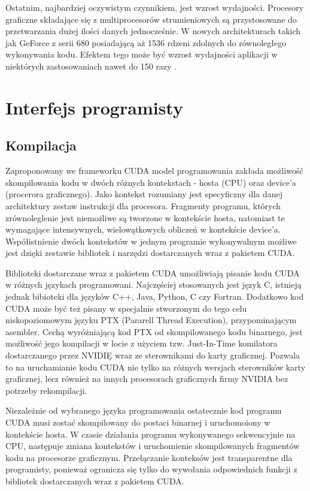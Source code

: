 Ostatnim, najbardziej oczywistym czynnikiem, jest wzrost wydajności. Procesory
graficzne składające się z multiprocesorów strumieniowych są przystosowane do
przetwarzania dużej ilości danych jednocześnie. W nowych architekturach takich
jak GeForce z serii 680 posiadającą aż 1536 rdzeni zdolnych do równoległego
wykonywania kodu. Efektem tego może być wzrost wydajności aplikacji w niektórych
zastosowaniach nawet do 150 razy \cite{prez}.

\section{Interfejs programisty}

\subsection{Kompilacja}

Zaproponowany we frameworku CUDA model programowania zakłada możliwość
skompilowania kodu w dwóch różnych kontekstach - hosta (CPU) oraz device'a
(procerora graficznego). Jako kontekst rozumiany jest specyficzny dla danej architektury zestaw
instrukcji dla procesora. Fragmenty programu, których zrównoleglenie jest
niemożliwe są tworzone w kontekście hosta, natomiast te wymagające intensywnych,
wielowątkowych obliczeń w kontekście device'a. Współistnienie dwóch
kontekstów w jednym programie wykonywalnym możliwe jest dzięki zestawie
bibliotek i narzędzi dostarczanych wraz z pakietem CUDA.

Biblioteki dostarczane wraz z pakietem CUDA umożliwiają pisanie kodu CUDA w różnych
językach programowani. Najczęściej stosowanych jest język C, istnieją jednak bibioteki
dla języków C++, Java, Python, C czy Fortran. Dodatkowo kod CUDA może być też pisany w specjalnie stworzonym do tego celu
niskopoziomowym języku PTX (Pararell Thread Execution), przypominającym asembler.
Cechą wyróżniającą kod PTX od skompilowanego kodu binarnego, jest możliwość jego
kompilacji w locie z użyciem tzw. Just-In-Time komilatora dostarczanego przez
NVIDIĘ wraz ze sterownikami do karty graficznej. Pozwala to na uruchamianie kodu
CUDA nie tylko na różnych wersjach sterowników karty graficznej, lecz również na
innych procesorach graficznych firmy NVIDIA bez potrzeby rekompilacji.

Niezależnie od wybranego języka programowania ostatecznie kod programu CUDA musi
zostać skompilowany do postaci binarnej i uruchomoiony w kontekście hosta. W
czasie działania programu wykonywanego sekwencyjnie na CPU, następuje zmiana
kontekstów i uruchomienie skompilowanych fragmentów kodu na procesorze graficznym.
Przełączanie konteksów jest transparentne dla programisty,
ponieważ ogranicza się tylko do wywołania odpowiednich funkcji z bibliotek
dostarczanych wraz z pakietem CUDA.

